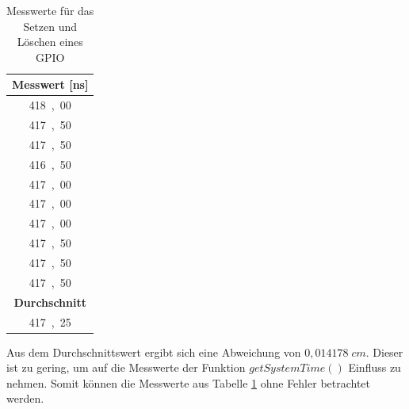 \begin{table}[H]
\centering
\caption{Messwerte für das Setzen und Löschen eines GPIO}
\label{table:modul_E2}
\begin{tabular}{|c|}
\hline
\textbf{Messwert [\si{ns}]} \\ \hline
\si{418,00}	 \\ \hline
\si{417,50}	 \\ \hline
\si{417,50}	 \\ \hline
\si{416,50}	 \\ \hline
\si{417,00}	 \\ \hline
\si{417,00}	 \\ \hline
\si{417,00}	 \\ \hline
\si{417,50}	 \\ \hline
\si{417,50}	 \\ \hline
\si{417,50}	 \\ \hline
\textbf{Durchschnitt}      \\ \hline
\si{417,25}	 \\ \hline
\end{tabular}
\end{table}

Aus dem Durchschnittswert ergibt sich eine Abweichung von $0,014178 \; cm$. Dieser ist zu gering, um auf die Messwerte der Funktion $getSystemTime()$ Einfluss zu nehmen. Somit können die Messwerte aus Tabelle \ref{table:modul_E2} ohne Fehler betrachtet werden.


